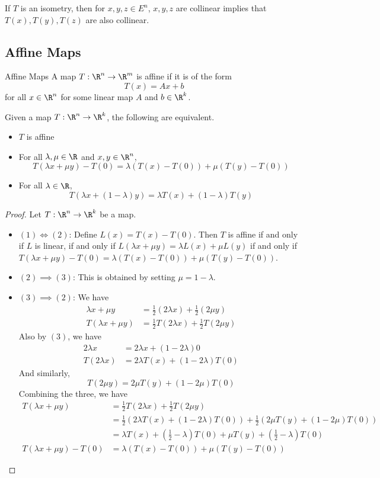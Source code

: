 \begin{prp}{}{} If $T$ is an isometry, then for $x,y,z\in E^n$, $x,y,z$ are collinear implies that $T(x),T(y),T(z)$ are also collinear. 
\end{prp}

\subsection{Affine Maps}
\begin{defn}{Affine Maps}{} A map $T:\R^n\to\R^m$ is affine if it is of the form $$T(x)=Ax+b$$ for all $x\in\R^n$ for some linear map $A$ and $b\in\R^k$. 
\end{defn}

\begin{prp}{}{} Given a map $T:\R^n\to\R^k$, the following are equivalent. 
\begin{itemize}
\item $T$ is affine
\item For all $\lambda,\mu\in\R$ and $x,y\in\R^n$, $$T(\lambda x+\mu y)-T(0)=\lambda(T(x)-T(0))+\mu(T(y)-T(0))$$
\item For all $\lambda\in\R$, $$T(\lambda x+(1-\lambda)y)=\lambda T(x)+(1-\lambda)T(y)$$
\end{itemize}\tcbline
\begin{proof} Let $T:\R^n\to\R^k$ be a map. 
\begin{itemize}
\item $(1)\iff(2)$: Define $L(x)=T(x)-T(0)$. Then $T$ is affine if and only if $L$ is linear, if and only if $L(\lambda x+\mu y)=\lambda L(x)+\mu L(y)$ if and only if $T(\lambda x+\mu y)-T(0)=\lambda(T(x)-T(0))+\mu(T(y)-T(0))$. 
\item $(2)\implies (3)$: This is obtained by setting $\mu=1-\lambda$. 
\item $(3)\implies (2)$: We have
\begin{align*}
\lambda x+\mu y&=\frac{1}{2}(2\lambda x)+\frac{1}{2}(2\mu y)\\
T(\lambda x+\mu y)&=\frac{1}{2}T(2\lambda x)+\frac{1}{2}T(2\mu y)\tag{By (3)}
\end{align*}
Also by $(3)$, we have
\begin{align*}
2\lambda x&=2\lambda x+(1-2\lambda)0\\
T(2\lambda x)&=2\lambda T(x)+(1-2\lambda)T(0)
\end{align*}
And similarly, $$T(2\mu y)=2\mu T(y)+(1-2\mu)T(0)$$
Combining the three, we have 
\begin{align*}
T(\lambda x+\mu y)&=\frac{1}{2}T(2\lambda x)+\frac{1}{2}T(2\mu y)\\
&=\frac{1}{2}(2\lambda T(x)+(1-2\lambda)T(0))+\frac{1}{2}(2\mu T(y)+(1-2\mu)T(0))\\
&=\lambda T(x)+\left(\frac{1}{2}-\lambda\right)T(0)+\mu T(y)+\left(\frac{1}{2}-\lambda\right)T(0)\\
T(\lambda x+\mu y)-T(0)&=\lambda(T(x)-T(0))+\mu(T(y)-T(0))
\end{align*}
\end{itemize}
\end{proof}
\end{prp}

